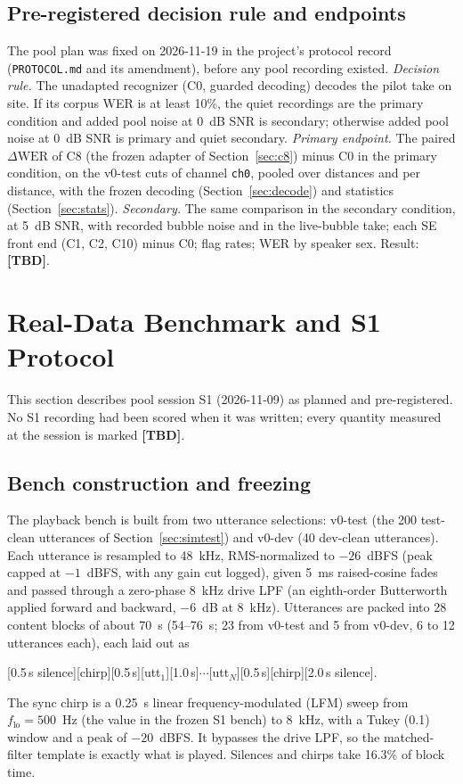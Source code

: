 \documentclass[conference]{IEEEtran}
\newcommand{\tbd}{\textbf{[TBD]}}
\begin{document}
\subsection{Pre-registered decision rule and endpoints}
\label{sec:endpoint}
The pool plan was fixed on 2026-11-19 in the project's protocol record (\texttt{PROTOCOL.md} and its
amendment), before any pool recording existed. \textit{Decision rule.} The unadapted recognizer (C0, guarded decoding) decodes the
pilot take on site. If its corpus WER is at least 10\%, the quiet recordings are the primary condition
and added pool noise at 0~dB SNR is secondary; otherwise added pool noise at 0~dB SNR is primary and
quiet secondary. \textit{Primary endpoint.} The paired $\Delta\mathrm{WER}$ of C8 (the frozen adapter
of Section~\ref{sec:c8}) minus C0 in the primary condition, on the v0-test cuts of channel
\texttt{ch0}, pooled over distances and per distance, with the frozen decoding
(Section~\ref{sec:decode}) and statistics (Section~\ref{sec:stats}). \textit{Secondary.} The same
comparison in the secondary condition, at 5~dB SNR, with recorded bubble noise and in the live-bubble
take; each SE front end (C1, C2, C10) minus C0; flag rates; WER by speaker sex. Result:
\tbd.

\iffalse
\section{Real-Data Benchmark and S1 Protocol}
\label{sec:bench}
This section describes pool session S1 (2026-11-09) as planned and pre-registered. No S1 recording
had been scored when it was written; every quantity measured at the session is marked \tbd.

\subsection{Bench construction and freezing}
\label{sec:benchbuild}
The playback bench is built from two utterance selections: v0-test (the 200 test-clean utterances of
Section~\ref{sec:simtest}) and v0-dev (40 dev-clean utterances). Each utterance is resampled to
48~kHz, RMS-normalized to $-26$~dBFS (peak capped at $-1$~dBFS, with any gain cut logged), given 5~ms
raised-cosine fades and passed through a zero-phase 8~kHz drive LPF (an eighth-order Butterworth
applied forward and backward, $-6$~dB at 8~kHz). Utterances are packed
into 28 content blocks of about 70~s (54--76~s; 23 from v0-test and 5 from v0-dev, 6 to 12 utterances
each),
each laid out as
\begin{center}
\small[0.5\,s silence][chirp][0.5\,s][utt$_1$][1.0\,s]$\cdots$[utt$_N$][0.5\,s][chirp][2.0\,s silence].
\end{center}
The sync chirp is a 0.25~s linear frequency-modulated (LFM) sweep from $f_{\mathrm{lo}} = 500$~Hz
(the value in the frozen S1 bench) to 8~kHz, with a Tukey (0.1) window and a
peak of $-20$~dBFS. It bypasses the drive LPF, so the matched-filter template is exactly what is
played. Silences and chirps take 16.3\% of block time.
\end{document}
